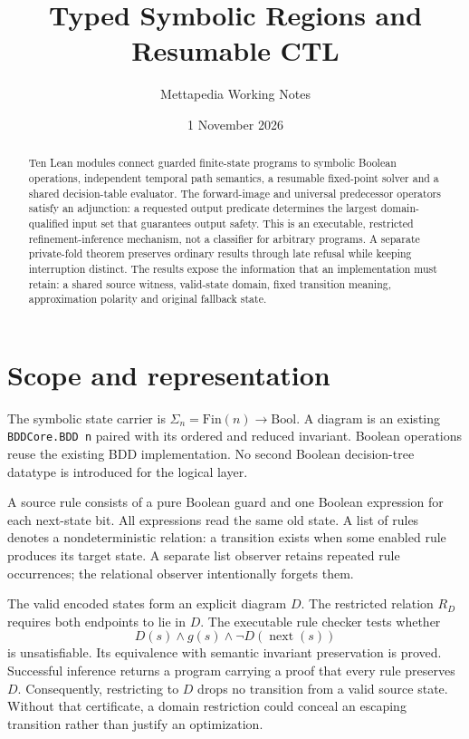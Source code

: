 \documentclass[11pt,a4paper]{article}
\title{Typed Symbolic Regions and Resumable CTL}
\author{Mettapedia Working Notes}
\date{1 November 2026}
\newcommand{\code}[1]{\nolinkurl{#1}}
\begin{document}
\maketitle
\begin{abstract}
Ten Lean modules connect guarded finite-state programs to symbolic Boolean
operations, independent temporal path semantics, a resumable fixed-point
solver and a shared decision-table evaluator. The forward-image and universal
predecessor operators satisfy an adjunction: a requested output predicate
determines the largest domain-qualified input set that guarantees output
safety. This is an executable, restricted refinement-inference mechanism,
not a classifier for arbitrary programs. A separate private-fold theorem
preserves ordinary results through late refusal while keeping interruption
distinct. The results expose the information that an implementation must
retain: a shared source witness, valid-state domain, fixed transition meaning,
approximation polarity and original fallback state.
\end{abstract}

\section{Scope and representation}

The symbolic state carrier is $\Sigma_n=\mathrm{Fin}(n)\to\mathrm{Bool}$.
A diagram is an existing \code{BDDCore.BDD n} paired with its ordered and
reduced invariant. Boolean operations reuse the existing BDD implementation.
No second Boolean decision-tree datatype is introduced for the logical layer.

A source rule consists of a pure Boolean guard and one Boolean expression for
each next-state bit. All expressions read the same old state. A list of rules
denotes a nondeterministic relation: a transition exists when some enabled
rule produces its target state. A separate list observer retains repeated
rule occurrences; the relational observer intentionally forgets them.

The valid encoded states form an explicit diagram $D$. The restricted relation
$R_D$ requires both endpoints to lie in $D$. The executable rule checker tests
whether
\[
 D(s)\land g(s)\land\neg D(\operatorname{next}(s))
\]
is unsatisfiable. Its equivalence with semantic invariant preservation is
proved. Successful inference returns a program carrying a proof that every
rule preserves $D$. Consequently, restricting to $D$ drops no transition
from a valid source state. Without that certificate, a domain restriction
could conceal an escaping transition rather than justify an optimization.
\end{document}
